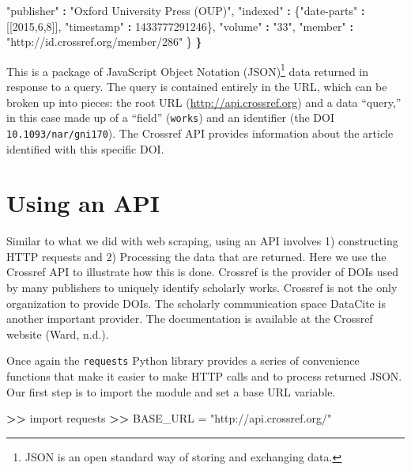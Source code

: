 \documentclass[]{krantz}
\newenvironment{Shaded}{\begin{snugshade}}{\end{snugshade}}
\newcommand{\DecValTok}[1]{\textcolor[rgb]{0.00,0.00,0.81}{#1}}
\newcommand{\StringTok}[1]{\textcolor[rgb]{0.31,0.60,0.02}{#1}}
\newcommand{\OperatorTok}[1]{\textcolor[rgb]{0.81,0.36,0.00}{\textbf{#1}}}
\newcommand{\ErrorTok}[1]{\textcolor[rgb]{0.64,0.00,0.00}{\textbf{#1}}}
\newcommand{\NormalTok}[1]{#1}
\begin{document}
\begin{Shaded}
\begin{Highlighting}[]
     \StringTok{"publisher"} \OperatorTok{:}\StringTok{ "Oxford University Press (OUP)"}\NormalTok{,}
     \StringTok{"indexed"} \OperatorTok{:}\StringTok{ }\NormalTok{\{}\StringTok{"date-parts"} \OperatorTok{:}\StringTok{ }\NormalTok{[[}\DecValTok{2015}\NormalTok{,}\DecValTok{6}\NormalTok{,}\DecValTok{8}\NormalTok{]],}
                  \StringTok{"timestamp"} \OperatorTok{:}\StringTok{ }\DecValTok{1433777291246}\NormalTok{\},}
     \StringTok{"volume"} \OperatorTok{:}\StringTok{ "33"}\NormalTok{,}
     \StringTok{"member"} \OperatorTok{:}\StringTok{ "http://id.crossref.org/member/286"}
\NormalTok{   \}}
\ErrorTok{\}}
\end{Highlighting}
\end{Shaded}

This is a package of JavaScript Object Notation (JSON)\footnote{JSON is
  an open standard way of storing and exchanging data.} data returned in
response to a query. The query is contained entirely in the URL, which
can be broken up into pieces: the root URL
(\url{http://api.crossref.org}) and a data ``query,'' in this case made
up of a ``field'' (\texttt{works}) and an identifier (the DOI
\texttt{10.1093/nar/gni170}). The Crossref API provides information
about the article identified with this specific DOI.

\section{Using an API}\label{sec:4-4}

Similar to what we did with web scraping, using an API involves 1)
constructing HTTP requests and 2) Processing the data that are returned.
Here we use the Crossref API to illustrate how this is done. Crossref is
the provider of DOIs used by many publishers to uniquely identify
scholarly works. Crossref is not the only organization to provide DOIs.
The scholarly communication space DataCite is another important
provider. The documentation is available at the Crossref website (Ward,
n.d.).

Once again the \texttt{requests} Python library provides a series of
convenience functions that make it easier to make HTTP calls and to
process returned JSON. Our first step is to import the module and set a
base URL variable.

\begin{Shaded}
\begin{Highlighting}[]
\OperatorTok{>}\ErrorTok{>}\StringTok{ }\NormalTok{import requests}
\OperatorTok{>}\ErrorTok{>}\StringTok{ }\NormalTok{BASE_URL =}\StringTok{ "http://api.crossref.org/"}
\end{Highlighting}
\end{Shaded}
\end{document}
